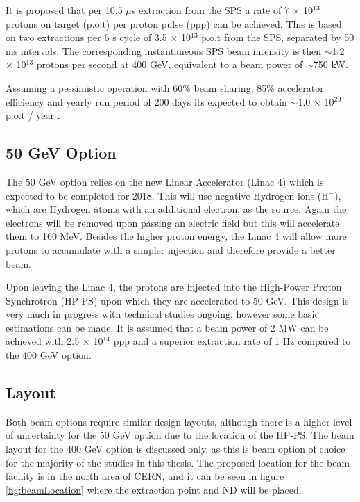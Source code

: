 It is proposed that per 10.5 $\mu$s extraction from the SPS a rate of 7 $\times$ 10$^{13}$ protons on target (p.o.t) per proton pulse (ppp) can be achieved. This is based on two extractions per 6 s cycle of 3.5 $\times$ 10$^{13}$ p.o.t from the SPS, separated by 50 ms intervals. The corresponding instantaneous SPS beam intensity is then $\sim$1.2 $\times$ 10$^{13}$ protons per second at 400 GeV, equivalent to a beam power of $\sim$750 kW.

Assuming a pessimistic operation with 60\% beam sharing, 85\% accelerator efficiency and yearly run period of 200 days its expected to obtain $\sim$1.0 $\times$ 10$^{20}$ p.o.t / year \cite{lbnoEoI}.

\subsection{50 GeV Option}
The 50 GeV option relies on the new Linear Accelerator (Linac 4) which is expected to be completed for 2018. This will use negative Hydrogen ions (H$^{-}$), which are Hydrogen atoms with an additional electron, as the source. Again the electrons will be removed upon passing an electric field but this will accelerate them to 160 MeV. Besides the higher proton energy, the Linac 4 will allow more protons to accumulate with a simpler injection and therefore provide a better beam.

Upon leaving the Linac 4, the protons are injected into the High-Power Proton Synchrotron (HP-PS) upon which they are accelerated to 50 GeV. This design is very much in progress with technical studies ongoing, however some basic estimations can be made. It is assumed that a beam power of 2 MW can be achieved with 2.5 $\times$ 10$^{14}$ ppp and a superior extraction rate of 1 Hz compared to the 400 GeV option.

\subsection{Layout}
Both beam options require similar design layouts, although there is a higher level of uncertainty for the 50 GeV option due to the location of the HP-PS. The beam layout for the 400 GeV option is discussed only, as this is beam option of choice for the majority of the studies in this thesis. The proposed location for the beam facility is in the north area of CERN, and it can be seen in figure \ref{fig:beamLocation} where the extraction point and ND will be placed.

